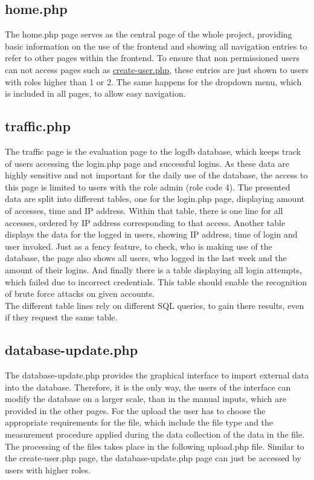 
\subsection{home.php}

The home.php page serves as the central page of the whole project, providing basic information on the use of the frontend and showing all navigation entries to refer to other pages 
within the frontend. To ensure that non permissioned users can not access pages such as \hyperref[create-user.php]{create-user.php}, these entries are just shown to users with roles 
higher than 1 or 2. The same happens for the dropdown menu, which is included in all pages, to allow easy navigation. 

\subsection{traffic.php}
The traffic page is the evaluation page to the logdb database, which keeps track of users accessing the login.php page and successful logins. As these data are highly sensitive and 
not important for the daily use of the database, the access to this page is limited to users with the role admin (role code 4). The presented data are split into different tables, 
one for the login.php page, displaying amount of accesses, time and IP address. Within that table, there is one line for all accesses, ordered by IP address corresponding to that access. 
Another table displays the data for the logged in users, showing IP address, time of login and user invoked. Just as a fency feature, to check, who is making use of the database, the page also 
shows all users, who logged in the last week and the amount of their logins. And finally there is a table displaying all login attempts, which failed due to 
incorrect credentials. This table should enable the recognition of brute force attacks on given accounts.\\
The different table lines rely on different SQL queries, to gain there results, even if they request the same table.

\subsection{database-update.php}
The database-update.php provides the graphical interface to import external data into the database. Therefore, it is the only way, the users of the interface can modify the database 
on a larger scale, than in the manual inputs, which are provided in the other pages. For the upload the user has to choose the appropriate requirements for the file, which include the file type and the 
measurement procedure applied during the data collection of the data in the file. The processing of the files takes place in the following upload.php file. Similar to the 
create-user.php page, the database-update.php page can just be accessed by users with higher roles. 

